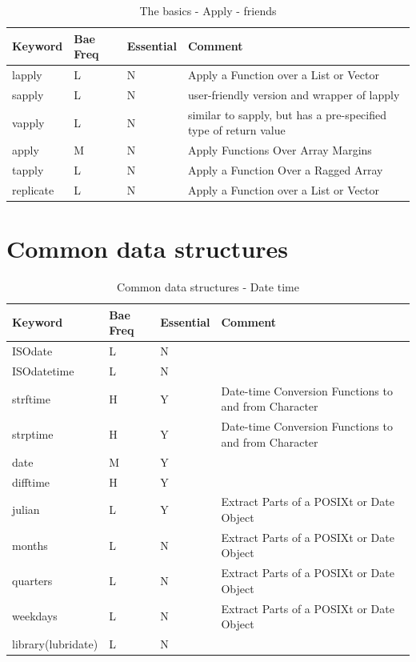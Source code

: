 \documentclass[11pt,]{krantz}
\theoremstyle{definition}
\theoremstyle{definition}
\theoremstyle{remark}
\begin{document}
\begin{longtable}[t]{llll}
\caption{\label{tab:knitchunk11}The basics - Apply - friends}\\
\toprule
Keyword & Bae Freq & Essential & Comment\\
\midrule
lapply & L & N & Apply a Function over a List or Vector\\
sapply & L & N & user-friendly version and wrapper of lapply\\
vapply & L & N & similar to sapply, but has a pre-specified type of return value\\
apply & M & N & Apply Functions Over Array Margins\\
tapply & L & N & Apply a Function Over a Ragged Array\\
replicate & L & N & Apply a Function over a List or Vector\\
\bottomrule
\end{longtable}

\section{Common data structures}\label{common-data-structures}

\begin{longtable}[t]{llll}
\caption{\label{tab:knitchunk12}Common data structures - Date time}\\
\toprule
Keyword & Bae Freq & Essential & Comment\\
\midrule
ISOdate & L & N & \\
ISOdatetime & L & N & \\
strftime & H & Y & Date-time Conversion Functions to and from Character\\
strptime & H & Y & Date-time Conversion Functions to and from Character\\
date & M & Y & \\
\addlinespace
difftime & H & Y & \\
julian & L & Y & Extract Parts of a POSIXt or Date Object\\
months & L & N & Extract Parts of a POSIXt or Date Object\\
quarters & L & N & Extract Parts of a POSIXt or Date Object\\
weekdays & L & N & Extract Parts of a POSIXt or Date Object\\
library(lubridate) & L & N & \\
\bottomrule
\end{longtable}
\end{document}
